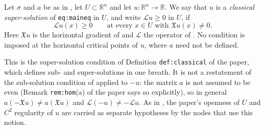 \begin{definition}
Let $\sigma$ and $a$ be as in , let $U\subset\mathbb{R}^n$ and let
$u:\mathbb{R}^n\to\mathbb{R}$. We say that $u$ is a \emph{classical super-solution} of
\texttt{eq:maineq} in $U$, and write $\mathcal{L}u\geq0$ in $U$, if
$$\mathcal{L}u(x)\geq0\qquad\text{at every }x\in U\text{ with }\mathfrak{X}u(x)\neq0 .$$
Here $\mathfrak{X}u$ is the horizontal gradient of  and $\mathcal{L}$ the operator
of . No condition is imposed at the horizontal critical points of $u$,
where $a$ need not be defined.

This is the super-solution condition of Definition \texttt{def:classical} of the paper, which
defines sub- and super-solutions in one breath. It is not a restatement of the sub-solution
condition of  applied to $-u$: the matrix $a$ is not assumed to be even
(Remark \texttt{rem:hom}(a) of the paper says so explicitly), so in general
$a(-\mathfrak{X}u)\neq a(\mathfrak{X}u)$ and $\mathcal{L}(-u)\neq-\mathcal{L}u$. As in
, the paper's openness of $U$ and $C^2$ regularity of $u$ are carried as
separate hypotheses by the nodes that use this notion.
\end{definition}
